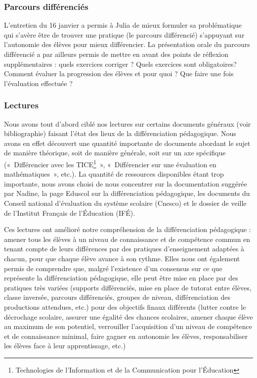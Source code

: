 
\subsubsection{Parcours différenciés}

L'entretien du 16 janvier a permis à Julia de mieux formuler sa problématique qui s’avère être de trouver une pratique (le parcours différencié) s’appuyant sur l’autonomie des élèves pour mieux différencier. La présentation orale du parcours différencié a par ailleurs permis de mettre en avant des points de réflexion supplémentaires : quels exercices corriger ? Quels exercices sont obligatoires? Comment évaluer la progression des élèves et pour quoi ? Que faire une fois l’évaluation effectuée ?

\subsubsection{Lectures}

Nous avons tout d’abord ciblé nos lectures sur certains documents généraux (voir bibliographie) faisant l’état des lieux de la différenciation pédagogique. Nous avons en effet découvert une quantité importante de documents abordant le sujet de manière théorique, soit de manière générale, soit sur un axe spécifique (« Différencier avec les TICE\footnote{Technologies de l'Information et de la Communication pour l'Éducation} », « Différencier sur une évaluation en mathématiques », etc.). La quantité de ressources disponibles étant trop importante, nous avons choisi de nous concentrer sur la documentation suggérée par Nadine, la page Eduscol sur la différenciation pédagogique, les documents du Conseil national d’évaluation du système scolaire (Cnesco) et le dossier de veille de l’Institut Français de l’Éducation (IFÉ).

Ces lectures ont amélioré notre compréhension de la différenciation pédagogique : amener tous les élèves à un niveau de connaissance et de compétence commun en tenant compte de leurs différences par des pratiques d’enseignement adaptées à chacun, pour que chaque élève avance à son rythme. Elles nous ont également permis de comprendre que, malgré l'existence d'un consensus sur ce que représente la différenciation pédagogique, elle peut être mise en place par des pratiques très variées (supports différenciés, mise en place de tutorat entre élèves, classe inversée, parcours différenciés, groupes de niveau, différenciation des productions attendues, etc.) pour des objectifs finaux différents (lutter contre le décrochage scolaire, assurer une égalité des chances scolaires, amener chaque élève au maximum de son potentiel, verrouiller l’acquisition d’un niveau de compétence et de connaissance minimal, faire gagner en autonomie les élèves, responsabiliser les élèves face à leur apprentissage, etc.)

